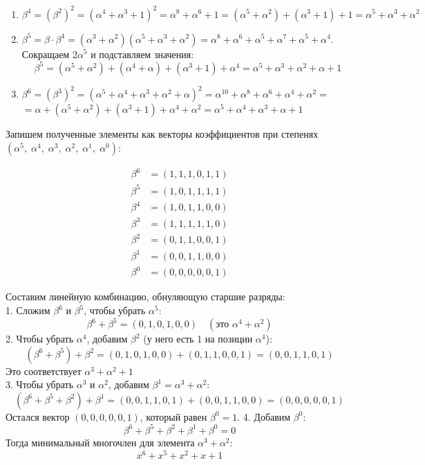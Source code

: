 \documentclass[12pt]{article}
\begin{document}
\begin{flushleft}
\begin{enumerate}
        \item $\beta^4 = (\beta^2)^2 = (\alpha^4 + \alpha^3 + 1)^2 = \alpha^8 + \alpha^6 + 1 = (\alpha^5 + \alpha^2) + (\alpha^3 + 1) + 1 = \alpha^5 + \alpha^3 + \alpha^2 $\\
        \item $\beta^5 = \beta \cdot \beta^4 = (\alpha^3 + \alpha^2)(\alpha^5 + \alpha^3 + \alpha^2) = \alpha^8 + \alpha^6 + \alpha^5 + \alpha^7 + \alpha^5 + \alpha^4$. \\
        Сокращаем $2\alpha^5$ и подставляем значения:
        $$ \beta^5 = (\alpha^5 + \alpha^2) + (\alpha^4 + \alpha) + (\alpha^3 + 1) + \alpha^4 = \alpha^5 + \alpha^3 + \alpha^2 + \alpha + 1 $$
        
        \item $\beta^6 = (\beta^3)^2 = (\alpha^5 + \alpha^4 + \alpha^3 + \alpha^2 + \alpha)^2 = \alpha^{10} + \alpha^8 + \alpha^6 + \alpha^4 + \alpha^2 = $ \\
        $ = \alpha + (\alpha^5 + \alpha^2) + (\alpha^3 + 1) + \alpha^4 + \alpha^2 = \alpha^5 + \alpha^4 + \alpha^3 + \alpha + 1 $ \\
    \end{enumerate}

    Запишем полученные элементы как векторы коэффициентов при степенях $(\alpha^5, \; \alpha^4, \; \alpha^3, \; \alpha^2, \; \alpha^1, \; \alpha^0)$:

    \begin{align*}
        \beta^6 &= (1, 1, 1, 0, 1, 1) \\
        \beta^5 &= (1, 0, 1, 1, 1, 1) \\
        \beta^4 &= (1, 0, 1, 1, 0, 0) \\
        \beta^3 &= (1, 1, 1, 1, 1, 0) \\
        \beta^2 &= (0, 1, 1, 0, 0, 1) \\
        \beta^1 &= (0, 0, 1, 1, 0, 0) \\
        \beta^0 &= (0, 0, 0, 0, 0, 1)
    \end{align*}

    Составим линейную комбинацию, обнуляющую старшие разряды: \\
    1. Сложим $\beta^6$ и $\beta^5$, чтобы убрать $\alpha^5$:
    $$ \beta^6 + \beta^5 = (0, 1, 0, 1, 0, 0) \quad (\text{это } \alpha^4 + \alpha^2) $$
    2. Чтобы убрать $\alpha^4$, добавим $\beta^2$ (у него есть 1 на позиции $\alpha^4$):
    $$ (\beta^6 + \beta^5) + \beta^2 = (0, 1, 0, 1, 0, 0) + (0, 1, 1, 0, 0, 1) = (0, 0, 1, 1, 0, 1) $$
    Это соответствует $\alpha^3 + \alpha^2 + 1$ \\
    3. Чтобы убрать $\alpha^3$ и $\alpha^2$, добавим $\beta^1 = \alpha^3 + \alpha^2$:
    $$ (\beta^6 + \beta^5 + \beta^2) + \beta^1 = (0, 0, 1, 1, 0, 1) + (0, 0, 1, 1, 0, 0) = (0, 0, 0, 0, 0, 1) $$
    Остался вектор $(0, 0, 0, 0, 0, 1)$, который равен $\beta^0 = 1$.
    4. Добавим $\beta^0$:
    $$ \beta^6 + \beta^5 + \beta^2 + \beta^1 + \beta^0 = 0 $$
    Тогда минимальный многочлен для элемента $\alpha^3 + \alpha^2$:
    $$x^6 + x^5 + x^2 + x + 1 $$

\end{flushleft}
\end{document}
